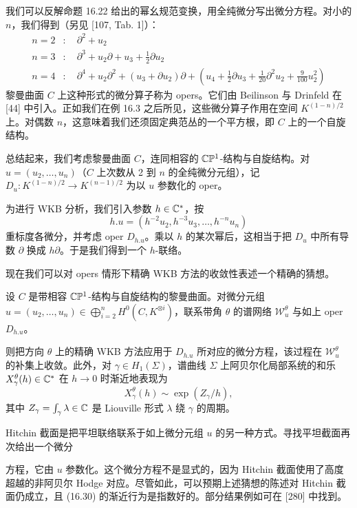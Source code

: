 我们可以反解命题 16.22 给出的幂幺规范变换，用全纯微分写出微分方程。对小的 $n$，我们得到（另见 [107, Tab. 1]）：
\[
\begin{aligned}
n=2&:\quad \partial^2+u_2\\
n=3&:\quad \partial^3+u_2\partial+u_3+\tfrac12\partial u_2\\
n=4&:\quad \partial^4+u_2\partial^2+(u_3+\partial u_2)\partial+\left(u_4+\tfrac12\partial u_3+\tfrac1{20}\partial^2u_2+\tfrac9{100}u_2^2\right)
\end{aligned}
\]
黎曼曲面 $C$ 上这种形式的微分算子称为 opers。它们由 Beilinson 与 Drinfeld 在 [44] 中引入。正如我们在例 16.3 之后所见，这些微分算子作用在空间 $K^{(1-n)/2}$ 上。对偶数 $n$，这意味着我们还须固定典范丛的一个平方根，即 $C$ 上的一个自旋结构。

总结起来，我们考虑黎曼曲面 $C$，连同相容的 $\mathbb{C}\mathbb{P}^1$-结构与自旋结构。对 $u=(u_2,\dots,u_n)$（$C$ 上次数从 2 到 $n$ 的全纯微分元组），记 $D_u:K^{(1-n)/2}\to K^{(n-1)/2}$ 为以 $u$ 参数化的 oper。

为进行 WKB 分析，我们引入参数 $h\in\mathbb{C}^*$，按
\[
h.u=(h^{-2}u_2,h^{-3}u_3,\dots,h^{-n}u_n)
\]
重标度各微分，并考虑 oper $D_{h.u}$。乘以 $h$ 的某次幂后，这相当于把 $D_u$ 中所有导数 $\partial$ 换成 $h\partial$。于是我们得到一个 $h$-联络。


现在我们可以对 opers 情形下精确 WKB 方法的收敛性表述一个精确的猜想。

\begin{conjecture}[16.23] 设 $C$ 是带相容 $\mathbb{C}\mathbb{P}^1$-结构与自旋结构的黎曼曲面。对微分元组 $u=(u_2,\dots,u_n)\in\bigoplus_{i=2}^{n}H^0(C,K^{\otimes i})$，联系带角 $\theta$ 的谱网络 $\mathcal{W}^\theta_u$ 与如上 oper $D_{h.u}$。
\end{conjecture}

则把方向 $\theta$ 上的精确 WKB 方法应用于 $D_{h.u}$ 所对应的微分方程，该过程在 $\mathcal{W}^\theta_u$ 的补集上收敛。此外，对 $\gamma\in H_1(\Sigma)$，谱曲线 $\Sigma$ 上阿贝尔化局部系统的和乐 $X^\theta_\gamma(h)\in\mathbb{C}^*$ 在 $h\to0$ 时渐近地表现为
\begin{equation}
X^\theta_\gamma(h)\sim\exp(Z_\gamma/h),
\tag{16.30}
\end{equation}
其中 $Z_\gamma=\int_\gamma\lambda\in\mathbb{C}$ 是 Liouville 形式 $\lambda$ 绕 $\gamma$ 的周期。

\begin{remark}[16.24] Hitchin 截面是把平坦联络联系于如上微分元组 $u$ 的另一种方式。寻找平坦截面再次给出一个微分

方程，它由 $u$ 参数化。这个微分方程不是显式的，因为 Hitchin 截面使用了高度超越的非阿贝尔 Hodge 对应。尽管如此，可以预期上述猜想的陈述对 Hitchin 截面仍成立，且 (16.30) 的渐近行为是指数好的。部分结果例如可在 [280] 中找到。\end{remark}

